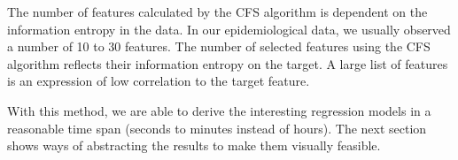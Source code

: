 \documentclass[journal]{style/vgtc} 			          %
\begin{document}
The number of features calculated by the CFS algorithm is dependent on the information entropy in the data.
In our epidemiological data, we usually observed a number of 10 to 30 features.
The number of selected features using the CFS algorithm reflects their information entropy on the target.
A large list of features is an expression of low correlation to the target feature.

With this method, we are able to derive the interesting regression models in a reasonable time span (seconds to minutes instead of hours).
The next section shows ways of abstracting the results to make them visually feasible.
\end{document}

